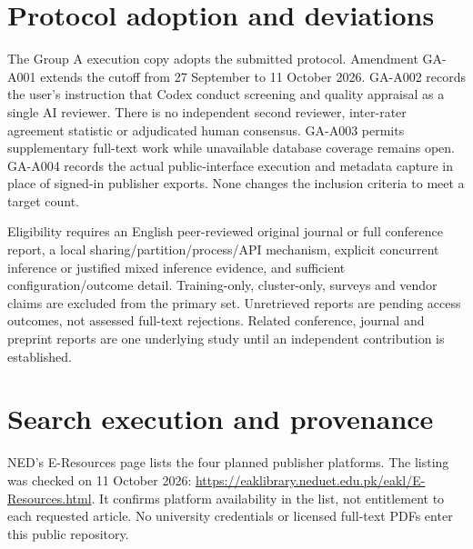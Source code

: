 \documentclass[12pt,a 4paper]{article}
\begin{document}
\section{Protocol adoption and deviations}
The Group A execution copy adopts the submitted protocol. Amendment GA-A001 extends the cutoff from 27 September to 11 October 2026. GA-A002 records the user's instruction that Codex conduct screening and quality appraisal as a single AI reviewer. There is no independent second reviewer, inter-rater agreement statistic or adjudicated human consensus. GA-A003 permits supplementary full-text work while unavailable database coverage remains open. GA-A004 records the actual public-interface execution and metadata capture in place of signed-in publisher exports. None changes the inclusion criteria to meet a target count.

Eligibility requires an English peer-reviewed original journal or full conference report, a local sharing/partition/process/API mechanism, explicit concurrent inference or justified mixed inference evidence, and sufficient configuration/outcome detail. Training-only, cluster-only, surveys and vendor claims are excluded from the primary set. Unretrieved reports are pending access outcomes, not assessed full-text rejections. Related conference, journal and preprint reports are one underlying study until an independent contribution is established.

\section{Search execution and provenance}
NED's E-Resources page lists the four planned publisher platforms. The listing was checked on 11 October 2026: \url{https://eaklibrary.neduet.edu.pk/eakl/E-Resources.html}. It confirms platform availability in the list, not entitlement to each requested article. No university credentials or licensed full-text PDFs enter this public repository.
\end{document}
